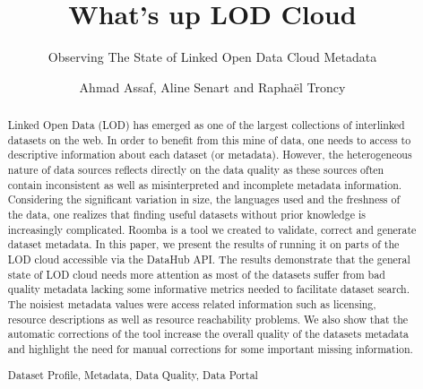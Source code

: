 \documentclass[runningheads,a4paper]{llncs}
\newcommand{\keywords}[1]{\par\addvspace\baselineskip
\noindent\keywordname\enspace\ignorespaces#1}
\begin{document}
\title{What's up LOD Cloud}
\subtitle{Observing The State of Linked Open Data Cloud Metadata}

\author{Ahmad Assaf, Aline Senart and Rapha\"{e}l Troncy }



\maketitle


\begin{abstract}

Linked Open Data (LOD) has emerged as one of the largest collections of interlinked datasets on the web. In order to benefit from this mine of data, one needs to access to descriptive information about each dataset (or metadata). However, the heterogeneous nature of data sources reflects directly on the data quality as these sources often contain inconsistent as well as misinterpreted and incomplete metadata information. Considering the significant variation in size, the languages used and the freshness of the data, one realizes that finding useful datasets without prior knowledge is increasingly complicated. Roomba is a tool we created to validate, correct and generate dataset metadata. In this paper, we present the results of running it on parts of the LOD cloud accessible via the DataHub API. The results demonstrate that the general state of LOD cloud needs more attention as most of the datasets suffer from bad quality metadata lacking some informative metrics needed to facilitate dataset search. The noisiest metadata values were access related information such as licensing, resource descriptions as well as resource reachability problems. We also show that the automatic corrections of the tool increase the overall quality of the datasets metadata and highlight the need for manual corrections for some important missing information.

\keywords{Dataset Profile, Metadata, Data Quality, Data Portal}
\end{abstract}
\end{document}
